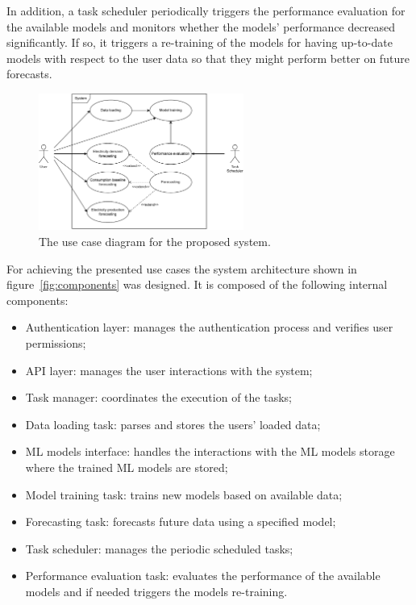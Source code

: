 In addition, a task scheduler periodically triggers the performance evaluation for the available models and monitors whether the models' performance decreased significantly.
If so, it triggers a re-training of the models for having up-to-date models with respect to the user data so that they might perform better on future forecasts.

\begin{figure}[H]
\centering
\includegraphics[width=0.6\textwidth]{images/architecture_use_case}
\caption{The use case diagram for the proposed system.}
\label{fig:usecase}
\end{figure}

For achieving the presented use cases the system architecture shown in figure~\ref{fig:components} was designed.
It is composed of the following internal components:
\begin{itemize}
  \item Authentication layer: manages the authentication process and verifies user permissions;
  \item API layer: manages the user interactions with the system;
  \item Task manager: coordinates the execution of the tasks;
  \item Data loading task: parses and stores the users' loaded data;
  \item ML models interface: handles the interactions with the ML models storage where the trained ML models are stored;
  \item Model training task: trains new models based on available data;
  \item Forecasting task: forecasts future data using a specified model;
  \item Task scheduler: manages the periodic scheduled tasks;
  \item Performance evaluation task: evaluates the performance of the available models and if needed triggers the models re-training.
\end{itemize}

